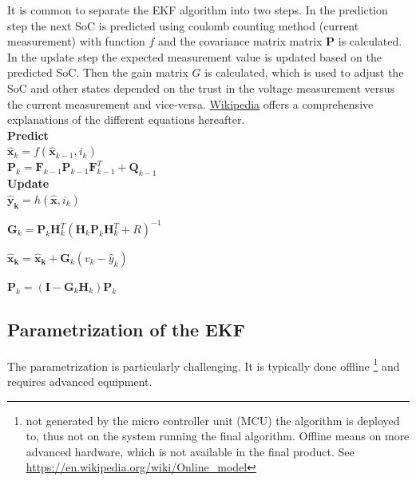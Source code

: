 It is common to separate the EKF algorithm into two steps. In the prediction step the next SoC is predicted using coulomb counting method (current measurement) with function $f$ and the covariance matrix
matrix $\boldsymbol P$ is calculated. In the update step the expected measurement value is updated based on the predicted SoC. Then the gain matrix $G$ is calculated, which is used to adjust the SoC and other states depended on the trust in the voltage measurement versus the current measurement and vice-versa.  \href{https://en.wikipedia.org/wiki/Extended_Kalman_filter}{Wikipedia} offers a comprehensive explanations of the different equations hereafter. \\

\textbf{Predict} \\

$\hat{\boldsymbol x}_k = f( \hat{\boldsymbol x}_{k-1}, {i}_{k})$ \\


$\boldsymbol P_k = \boldsymbol F_{k-1} \boldsymbol P_{k-1} \boldsymbol F^T_{k-1} + \boldsymbol Q_{k-1}$ \\

\textbf{Update} \\ 

$\boldsymbol {\hat{y}_k} = h( \hat{\boldsymbol x},i_k) $ %


$\boldsymbol G_k = \boldsymbol P_k \boldsymbol H^T_k (\boldsymbol H_k \boldsymbol P_k \boldsymbol H^T_k +  R)^{-1}$

$\boldsymbol {\hat{x}_k} = \boldsymbol  {\hat{x}_k} + \boldsymbol G_k(v_k - \hat{y}_k)$
 

$\boldsymbol P_k = (\boldsymbol I - \boldsymbol G_k \boldsymbol H_k) \boldsymbol P_k$ \\



\subsection{Parametrization of the EKF}
\label{Parametrization}

The parametrization is particularly challenging. It is typically done offline \footnote{not generated by the micro controller unit (MCU) the algorithm is deployed to, thus not on the system running the final algorithm. Offline means on more advanced hardware, which is not available in the final product. See \url{https://en.wikipedia.org/wiki/Online_model} } and requires advanced equipment.


